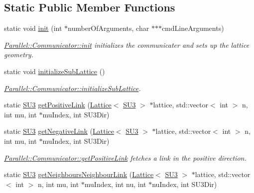 \subsection*{Static Public Member Functions}
\begin{DoxyCompactItemize}
\item 
static void \mbox{\hyperlink{class_parallel_1_1_communicator_a4ed2a77c33cd899b31131e44fc906fd7}{init}} (int $\ast$number\+Of\+Arguments, char $\ast$$\ast$$\ast$cmd\+Line\+Arguments)
\begin{DoxyCompactList}\small\item\em \mbox{\hyperlink{class_parallel_1_1_communicator_a4ed2a77c33cd899b31131e44fc906fd7}{Parallel\+::\+Communicator\+::init}} initializes the communicater and sets up the lattice geometry. \end{DoxyCompactList}\item 
static void \mbox{\hyperlink{class_parallel_1_1_communicator_a3094d713d09225738ecf0250019db115}{initialize\+Sub\+Lattice}} ()
\begin{DoxyCompactList}\small\item\em \mbox{\hyperlink{class_parallel_1_1_communicator_a3094d713d09225738ecf0250019db115}{Parallel\+::\+Communicator\+::initialize\+Sub\+Lattice}}. \end{DoxyCompactList}\item 
static \mbox{\hyperlink{class_s_u3}{S\+U3}} \mbox{\hyperlink{class_parallel_1_1_communicator_aa716fcde544018dcc5967df9b6708bb5}{get\+Positive\+Link}} (\mbox{\hyperlink{class_lattice}{Lattice}}$<$ \mbox{\hyperlink{class_s_u3}{S\+U3}} $>$ $\ast$lattice, std\+::vector$<$ int $>$ n, int mu, int $\ast$mu\+Index, int S\+U3\+Dir)
\item 
static \mbox{\hyperlink{class_s_u3}{S\+U3}} \mbox{\hyperlink{class_parallel_1_1_communicator_ae843d16f4aed13d5b5179a05b717ec88}{get\+Negative\+Link}} (\mbox{\hyperlink{class_lattice}{Lattice}}$<$ \mbox{\hyperlink{class_s_u3}{S\+U3}} $>$ $\ast$lattice, std\+::vector$<$ int $>$ n, int mu, int $\ast$mu\+Index, int S\+U3\+Dir)
\begin{DoxyCompactList}\small\item\em \mbox{\hyperlink{class_parallel_1_1_communicator_aa716fcde544018dcc5967df9b6708bb5}{Parallel\+::\+Communicator\+::get\+Positive\+Link}} fetches a link in the positive direction. \end{DoxyCompactList}\item 
static \mbox{\hyperlink{class_s_u3}{S\+U3}} \mbox{\hyperlink{class_parallel_1_1_communicator_a27862560cf6c7b8ccf650a422e014776}{get\+Neighbours\+Neighbour\+Link}} (\mbox{\hyperlink{class_lattice}{Lattice}}$<$ \mbox{\hyperlink{class_s_u3}{S\+U3}} $>$ $\ast$lattice, std\+::vector$<$ int $>$ n, int mu, int $\ast$mu\+Index, int nu, int $\ast$nu\+Index, int S\+U3\+Dir)

\end{DoxyCompactItemize}
